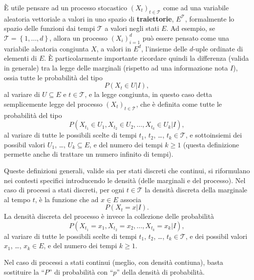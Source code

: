 \documentclass[
  italian,
  letterpaper,
]{book}
\newcommand{\cur}[1]{\left\{ #1 \right\}}
\theoremstyle{definition}
\theoremstyle{remark}
\begin{document}
È utile pensare ad un processo stocastico \((X_t)_{t \in \mathcal{T}}\)
come ad una variabile aleatoria vettoriale a valori in uno spazio di
\textbf{traiettorie}, \(E^{\mathcal{T}}\), formalmente lo spazio delle
funzioni dai tempi \(\mathcal{T}\) a valori negli stati \(E\). Ad
esempio, se \(\mathcal{T} = \cur{1, \ldots, d}\), allora un processo
\((X_i)_{i=1}^d\) può essere pensato come una variabile aleatoria
congiunta \(X\), a valori in \(E^d\), l'insieme delle \(d\)-uple
ordinate di elementi di \(E\). È particolarmente importante ricordare
quindi la differenza (valida in generale) tra la legge delle marginali
(rispetto ad una informazione nota \(I\)), ossia tutte le probabilità
del tipo \[ P(X_t \in U|I),\] al variare di \(U \subseteq E\) e
\(t \in \mathcal{T}\), e la legge congiunta, in questo caso detta
semplicemente legge del processo \((X_t)_{t \in \mathcal{T}}\), che è
definita come tutte le probabilità del tipo
\[ P(X_{t_1} \in U_1, X_{t_2} \in U_2, \ldots, X_{t_k} \in U_k | I),\]
al variare di tutte le possibili scelte di tempi \(t_1\), \(t_2\),
\ldots, \(t_k \in \mathcal{T}\), e sottoinsiemi dei possibil valori
\(U_1\), \ldots, \(U_k \subseteq E\), e del numero dei tempi \(k \ge 1\)
(questa definizione permette anche di trattare un numero infinito di
tempi).

Queste definizioni generali, valide sia per stati discreti che continui,
si riformulano nei contesti specifici introducendo le densità (delle
marginali e del processo). Nel caso di processi a stati discreti, per
ogni \(t \in \mathcal{T}\) la densità discreta della marginale al tempo
\(t\), è la funzione che ad \(x \in E\) associa \[ P(X_t = x |I ).\] La
densità discreta del processo è invece la collezione delle probabilità
\[ P(X_{t_1}= x_1, X_{t_2}=x_2, \ldots, X_{t_k} =x_k| I),\] al variare
di tutte le possibili scelte di tempi \(t_1\), \(t_2\), \ldots,
\(t_k \in \mathcal{T}\), e dei possibil valori \(x_1\), \ldots,
\(x_k \in E\), e del numero dei tempi \(k \ge 1\).

Nel caso di processi a stati continui (meglio, con densità contiuna),
basta sostituire la ``\(P\)'' di probabilità con ``\(p\)'' della densità
di probabilità.
\end{document}
